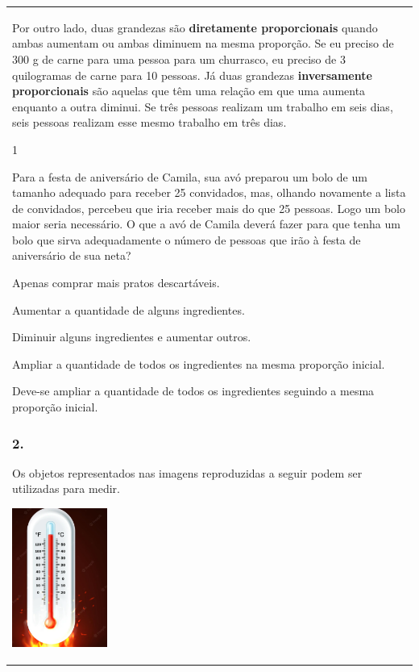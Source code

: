 \begin{mdframed}[linewidth=2pt,linecolor=salmao,roundcorner=2pt]
\begin{escolha}
{{{\begin{longtable}[]{@{}l@{}}
\begin{itemize}
Por outro lado, duas grandezas são \textbf{diretamente proporcionais} quando ambas aumentam ou ambas diminuem na mesma proporção. Se eu preciso de 300 g de carne para uma pessoa para um churrasco, eu preciso de 3 quilogramas de carne para 10 pessoas. Já duas grandezas \textbf{inversamente proporcionais} são aquelas que têm uma relação em que uma aumenta enquanto a outra diminui. Se três pessoas realizam um trabalho em seis dias, seis pessoas realizam esse mesmo trabalho em três dias.

{Atividades}

\num{1}

Para a festa de aniversário de Camila, sua avó preparou um bolo de um
tamanho adequado para receber 25 convidados, mas, olhando novamente a
lista de convidados, percebeu que iria receber mais do que 25 pessoas. Logo um bolo maior seria necessário.
O que a avó de Camila deverá fazer para que tenha um bolo que sirva
adequadamente o número de pessoas que irão à festa de aniversário de sua
neta?

\begin{escolha}
\item
  Apenas comprar mais pratos descartáveis.
\item
  Aumentar a quantidade de alguns ingredientes.
\item
  Diminuir alguns ingredientes e aumentar outros.
\item
  Ampliar a quantidade de todos os ingredientes na mesma proporção
  inicial.
\end{escolha}

Deve-se ampliar a quantidade de todos os ingredientes seguindo a mesma
proporção inicial.

\subsubsection{2. }

Os objetos representados nas imagens reproduzidas a seguir podem ser utilizadas para medir.

\includegraphics[width=1.22500in,height=1.79354in]{media/image128.png}


\end{itemize}
\end{longtable}}}}
\end{escolha}
\end{mdframed}
